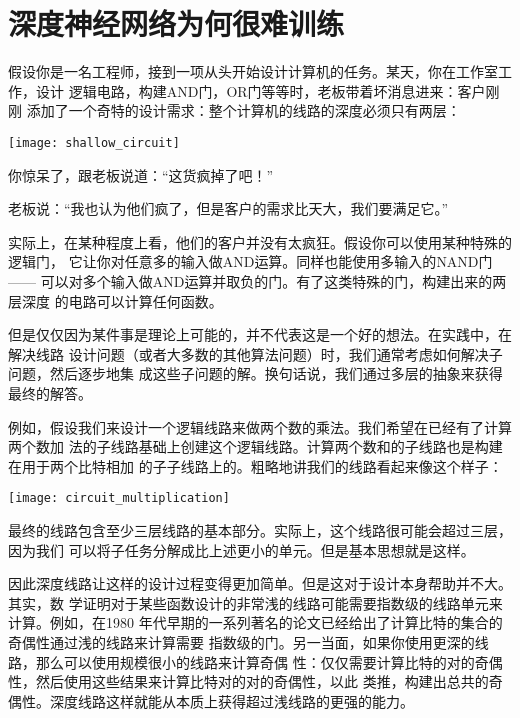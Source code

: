 
\chapter{深度神经网络为何很难训练}
\label{ch:WhyHardToTrain}

假设你是一名工程师，接到一项从头开始设计计算机的任务。某天，你在工作室工作，设计
逻辑电路，构建{\serif AND}门，{\serif OR}门等等时，老板带着坏消息进来：客户刚刚
添加了一个奇特的设计需求：整个计算机的线路的深度必须只有两层：
\begin{center}
  \texttt{[image: shallow\_circuit]}
\end{center}

你惊呆了，跟老板说道：“这货疯掉了吧！”
 
老板说：“我也认为他们疯了，但是客户的需求比天大，我们要满足它。”
 
实际上，在某种程度上看，他们的客户并没有太疯狂。假设你可以使用某种特殊的逻辑门，
它让你对任意多的输入做{\serif AND}运算。同样也能使用多输入的{\serif NAND}门 ——
可以对多个输入做{\serif AND}运算并取负的门。有了这类特殊的门，构建出来的两层深度
的电路可以计算任何函数。

但是仅仅因为某件事是理论上可能的，并不代表这是一个好的想法。在实践中，在解决线路
设计问题（或者大多数的其他算法问题）时，我们通常考虑如何解决子问题，然后逐步地集
成这些子问题的解。换句话说，我们通过多层的抽象来获得最终的解答。

例如，假设我们来设计一个逻辑线路来做两个数的乘法。我们希望在已经有了计算两个数加
法的子线路基础上创建这个逻辑线路。计算两个数和的子线路也是构建在用于两个比特相加
的子子线路上的。粗略地讲我们的线路看起来像这个样子：
\begin{center}
  \texttt{[image: circuit\_multiplication]}
\end{center}

最终的线路包含至少三层线路的基本部分。实际上，这个线路很可能会超过三层，因为我们
可以将子任务分解成比上述更小的单元。但是基本思想就是这样。
 
因此深度线路让这样的设计过程变得更加简单。但是这对于设计本身帮助并不大。其实，数
学证明对于某些函数设计的非常浅的线路可能需要指数级的线路单元来计算。例如，在1980
年代早期的一系列著名的论文已经给出了计算比特的集合的奇偶性通过浅的线路来计算需要
指数级的门。另一当面，如果你使用更深的线路，那么可以使用规模很小的线路来计算奇偶
性：仅仅需要计算比特的对的奇偶性，然后使用这些结果来计算比特对的对的奇偶性，以此
类推，构建出总共的奇偶性。深度线路这样就能从本质上获得超过浅线路的更强的能力。
 
